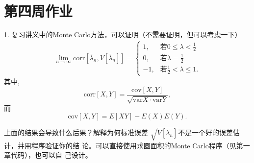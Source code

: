 \documentclass[a4paper]{ctexart}
\begin{document}
\section*{第四周作业}


1. 复习讲义中的Monte Carlo方法，可以证明（不需要证明，但可以考虑一下）
  \begin{eqnarray}
    \lim_{n \to \infty} \mathrm{corr}[\bar{\lambda}_n, V[\bar{\lambda}_n]] =
    \left\{
    \begin{array}{ll}
      1,& \mbox{若} 0 \leq \lambda < \frac{1}{2} \\
      0,& \mbox{若} \lambda = \frac{1}{2} \\
      -1, & \mbox{若} \frac{1}{2} < \lambda \leq 1.
    \end{array}
    \right.
  \end{eqnarray}
  其中,
  $$ \mathrm{corr}[X, Y] = \frac{\mathrm{cov}[X,
      Y]}{\sqrt{\mathrm{var} X \cdot \mathrm{var} Y}},
  $$
  而
  $$
  \mathrm{cov}[X, Y] = E[XY] - E(X)E(Y).
  $$

  上面的结果会导致什么后果？解释为何标准误差
  $\sqrt{V[\bar{\lambda}_n]}$不是一个好的误差估计，并用程序验证你的结
  论。可以直接使用求圆面积的Monte Carlo程序（见第一章代码），也可以自
  己设计。
\end{document}
